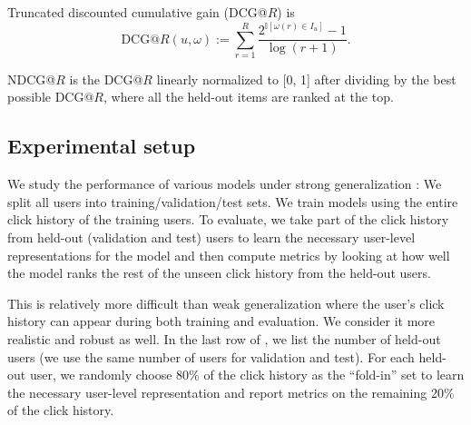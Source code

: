 \documentclass[sigconf]{acmart}
\begin{document}
Truncated discounted cumulative gain (DCG@$R$) is
\[
\textrm{DCG@}R(u, \omega) := \sum_{r=1}^R \frac{2^{\mathbb{I}[\omega(r) \in I_u]} - 1}{\log(r+1)}.
\]

NDCG@$R$ is the DCG@$R$ linearly normalized to [0, 1] after dividing by the best possible DCG@$R$, where all the held-out items are ranked at the top. 

\subsection{Experimental setup}
We study the performance of various models under strong generalization \citep{marlin2004collaborative}: We split all users into training/validation/test sets. We train models using the entire click history of the training users. To evaluate, we take part of the click history from held-out (validation and test) users to learn the necessary user-level representations for the model and then compute metrics by looking at how well the model ranks the rest of the unseen click history from the held-out users. 

This is relatively more difficult than weak generalization where the user's click history can appear during both training and evaluation. We consider it more realistic and robust as well. In the last row of , we list the number of held-out users (we use the same number of users for validation and test). For each held-out user, we randomly choose 80\% of the click history as the ``fold-in'' set to learn the necessary user-level representation and report metrics on the remaining 20\% of the click history. 
\end{document}
